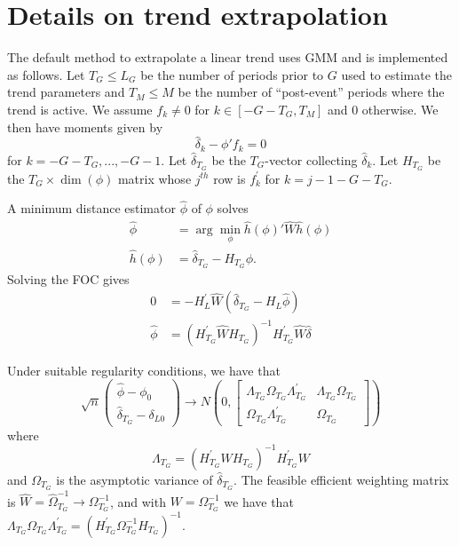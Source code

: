 \documentclass[12pt]{article}
\begin{document}



\clearpage

\appendix

\section{Details on trend extrapolation}
\label{sec:app_trend}

The default method to extrapolate a linear trend uses GMM and is implemented as follows.
Let $T_G \leq L_G$ be the number of periods prior to $G$ used to estimate the trend parameters and $T_M \leq M$ be the number of ``post-event'' periods where the trend is active.
We assume $f_k \neq 0$ for $k \in \left[-G-T_G,T_M \right]$ and $0$ otherwise.
We then have moments given by
\[
\widehat{\delta}_{k}-\phi'f_{k}=0
\]
for $k=-G-T_G,...,-G-1$. Let $\widehat{\delta}_{T_G}$ be the $T_{G}$-vector
collecting $\widehat{\delta}_{k}$. Let $H_{T_G}$ be the $T_{G}\times\dim\left(\phi\right)$
matrix whose $j^{th}$ row is $f_{k}^{'}$ for $k=j-1-G-T_{G}$.

A minimum distance estimator $\widehat{\phi}$ of $\phi$ solves
\begin{align*}
\widehat{\phi} & =\arg\min_{\phi}\widehat{h}\left(\phi\right)'\widehat{W}\widehat{h}\left(\phi\right)\\
\widehat{h}\left(\phi\right) & =\widehat{\delta}_{T_G}-H_{T_G}\phi.
\end{align*}
Solving the FOC gives
\[
\begin{array}{rl}
0 & =-H_{L}^{\prime}\widehat{W}(\widehat{\delta}_{T_G}-H_{L}\widehat{\phi})\\
\widehat{\phi} & =(H_{T_G}^{\prime}\widehat{W}H_{T_G})^{-1}H_{T_G}^{\prime}\widehat{W}\widehat{\delta}
\end{array}
\]

Under suitable regularity conditions, we have that
\[
\sqrt{n}\left(\begin{array}{c}
\widehat{\phi}-\phi_{0}\\
\widehat{\delta}_{T_G}-\delta_{L0}
\end{array}\right)\to N\left(0,\begin{bmatrix}\Lambda_{T_G}\Omega_{T_G}\Lambda_{T_G}^{\prime} & \Lambda_{T_G}\Omega_{T_G}\\
\Omega_{T_G}\Lambda_{T_G}^{\prime} & \Omega_{T_G}
\end{bmatrix}\right)
\]
where
\[
\Lambda_{T_G}=(H_{T_G}^{\prime}WH_{T_G})^{-1}H_{T_G}^{\prime}W
\]
and $\Omega_{T_G}$ is the asymptotic variance of $\widehat{\delta}_{T_G}$.
The feasible efficient weighting matrix is $\widehat{W}=\widehat{\Omega}_{T_G}^{-1}\to\Omega_{T_G}^{-1}$,
and with $W=\Omega_{T_G}^{-1}$ we have that $\Lambda_{T_G}\Omega_{T_G}\Lambda_{T_G}^{\prime}=(H_{T_G}^{\prime}\Omega_{T_G}^{-1}H_{T_G})^{-1}.$
\end{document}
